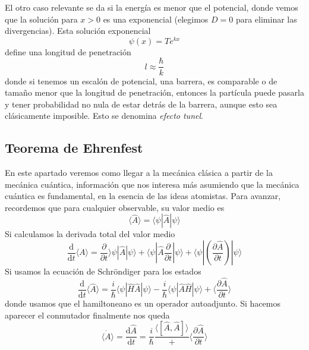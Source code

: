El otro caso relevante se da si la energía es menor que el potencial, donde vemos que la solución para $x > 0$ es una exponencial (elegimos $D = 0$ para eliminar las divergencias).
Esta solución exponencial
\begin{equation}
    \psi(x) = T e^{k x}
\end{equation}
define una longitud de penetración 
\begin{equation}
    l \approx \frac{\hbar}{k}
\end{equation}
donde si tenemos un escalón de potencial, una barrera,  es comparable o de tamaño menor que la longitud de penetración, entonces la partícula puede pasarla y tener probabilidad no nula de estar detrás de la barrera, aunque esto sea clásicamente imposible.
Esto se denomina \emph{efecto tunel}.


\subsection{Teorema de Ehrenfest}
En este apartado veremos como llegar a la mecánica clásica a partir de la mecánica cuántica, información que nos interesa más asumiendo que la mecánica cuántica es fundamental, en la esencia de las ideas atomistas.
Para avanzar, recordemos que para cualquier observable, su valor medio es
\begin{equation}
    \langle \hat{A} \rangle = \langle \psi | \hat{A} | \psi \rangle
\end{equation}
Si calculamos la derivada total del valor medio
\[\frac{\mathrm{d}}{\mathrm{d}t} \langle A \rangle = \frac{\partial}{\partial t} \rangle \psi | \hat{A} | \psi \rangle + \langle \psi | \hat{A} \frac{\partial}{\partial t} |\psi\rangle + \langle \psi | \left( \frac{\partial \hat{A}}{\partial t}\right) |\psi\rangle\]
Si usamos la ecuación de Schröndiger para los estados
\[\frac{\mathrm{d}}{\mathrm{d}t} \langle \hat{A} \rangle = \frac{i}{\hbar} \langle \psi | \hat{H} \hat{A} |\psi\rangle - \frac{i}{\hbar} \langle \psi | \hat{A} \hat{H} |\psi \rangle + \langle \frac{\partial \hat{A}}{\partial t} \rangle\]
donde usamos que el hamiltoneano es un operador autoadjunto.
Si hacemos aparecer el conmutador finalmente nos queda
\begin{equation}
    \dot{\langle A \rangle} = \frac{\mathrm{d}\hat{A}}{\mathrm{d}t} = \frac{i}{\hbar} \frac{\langle[\hat{A}, \hat{A}]\rangle} + \langle\frac{\partial \hat{A}}{\partial t} \rangle
  \label{eq:vmedio_derivada_total}
\end{equation}

